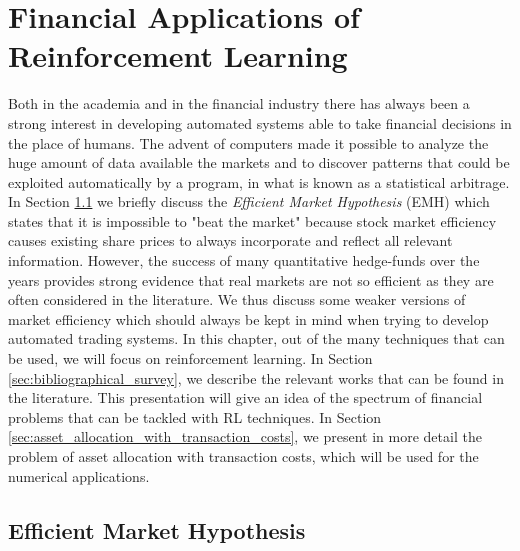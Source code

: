 \chapter{Financial Applications of Reinforcement Learning}
\label{ch:financial_applications_of_reinforcement_learning}

Both in the academia and in the financial industry there has always been a strong interest in developing automated systems able to take financial decisions in the place of humans. The advent of computers made it possible to analyze the huge amount of data available the markets and to discover patterns that could be exploited automatically by a program, in what is known as a statistical arbitrage. In Section  \ref{sec:efficient_market_hypothesis} we briefly discuss the \emph{Efficient Market Hypothesis} (EMH) which states that it is impossible to "beat the market" because stock market efficiency causes existing share prices to always incorporate and reflect all relevant information. However, the success of many quantitative hedge-funds over the years provides strong evidence that real markets are not so efficient as they are often considered in the literature. We thus discuss some weaker versions of market efficiency which should always be kept in mind when trying to develop automated trading systems. In this chapter, out of the many techniques that can be used, we will focus on reinforcement learning. In Section \ref{sec:bibliographical_survey}, we describe the relevant works that can be found in the literature. This presentation will give an idea of the spectrum of financial problems that can be tackled with RL techniques. In Section \ref{sec:asset_allocation_with_transaction_costs}, we present in more detail the problem of asset allocation with transaction costs, which will be used for the numerical applications.

\section{Efficient Market Hypothesis}  
\label{sec:efficient_market_hypothesis}

